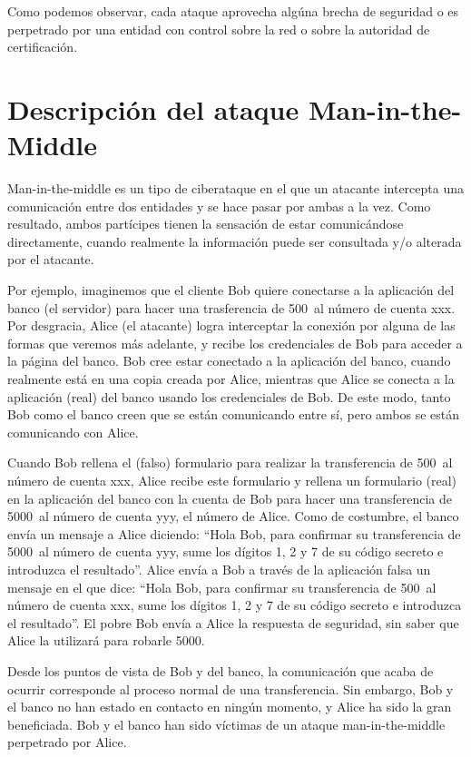 \documentclass[11pt]{article}
\begin{document}
Como podemos observar, cada ataque aprovecha algúna brecha de seguridad o es perpetrado por una entidad con control sobre la red o sobre la autoridad
de certificación.

\section{Descripción del ataque Man-in-the-Middle}

Man-in-the-middle es un tipo de ciberataque en el que un atacante intercepta una comunicación entre dos entidades y se hace pasar por ambas a la vez.
Como resultado, ambos partícipes tienen la sensación de estar comunicándose directamente, cuando realmente la información puede ser
consultada y/o alterada por el atacante. 

Por ejemplo, imaginemos que el cliente Bob quiere conectarse a la aplicación del banco (el servidor) para hacer una trasferencia de 500\EUR \ al número de cuenta
xxx. Por desgracia, Alice (el atacante) logra interceptar la conexión por alguna de las formas que veremos más adelante, y recibe los credenciales de Bob para
acceder a la página del banco. Bob cree estar conectado a la aplicación del banco, cuando realmente está en una copia creada por Alice, mientras
que Alice se conecta a la aplicación (real) del banco usando los credenciales de Bob. De este modo, tanto Bob como el banco creen que se están
comunicando entre sí, pero ambos se están comunicando con Alice.

Cuando Bob rellena el (falso) formulario para realizar la transferencia de 500\EUR \ al número de cuenta xxx, Alice recibe este formulario y
rellena un formulario (real) en la aplicación del banco con la cuenta de Bob para hacer una transferencia de 5000\EUR \ al número de cuenta yyy,
el número de Alice. Como de costumbre, el banco envía un mensaje a Alice diciendo: ``Hola Bob, para confirmar su transferencia de 5000\EUR \ al número
 de cuenta yyy, sume los dígitos 1, 2 y 7 de su código secreto e introduzca el resultado''. Alice envía a Bob a través de la aplicación falsa
 un mensaje en el que dice:
 ``Hola Bob, para confirmar su transferencia de 500\EUR \ al número
 de cuenta xxx, sume los dígitos 1, 2 y 7 de su código secreto e introduzca el resultado''. El pobre Bob envía a Alice la respuesta de seguridad,
 sin saber que Alice la utilizará para robarle 5000\EUR. 
 
 Desde los puntos de vista de Bob y del banco, la comunicación que acaba de ocurrir corresponde al proceso normal de una transferencia. Sin embargo,
 Bob y el banco no han estado en contacto en ningún momento, y Alice ha sido la gran beneficiada. 
 Bob y el banco han sido víctimas de un ataque man-in-the-middle perpetrado por Alice.
 
\end{document}
